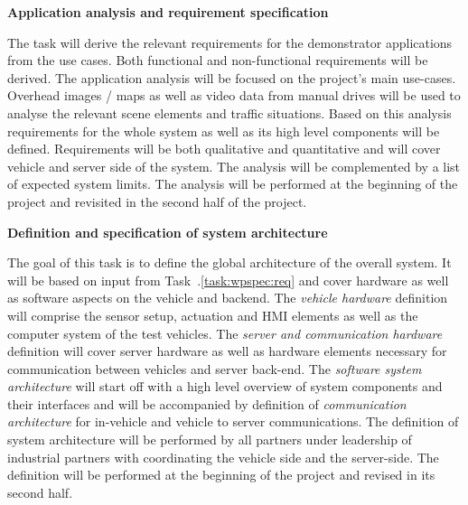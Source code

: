 {\begin{tasks}{\WPSpecificationNo}
\item  {\bf Application analysis and requirement specification}
  \label{task:wpspec:req}

The task will derive the relevant requirements for the demonstrator applications from the use cases. Both functional and non-functional requirements will be derived. The application analysis will be focused on the project's main use-cases. Overhead images / maps as well as video data from manual drives will be used to analyse the relevant scene elements and traffic situations. Based on this analysis requirements for the whole system as well as its high level components will be defined. Requirements will be both qualitative and quantitative and will cover vehicle and server side of the system. The analysis will be complemented by a list of expected system limits. The analysis will be performed at the beginning of the project and revisited in the second half of the project.


%


\item {\bf Definition and specification of system architecture}
  \label{task:wpint:arch}

The goal of this task is to define the global architecture of the overall system. It will be based on input from Task~\WPSpecificationNo.\ref{task:wpspec:req} and cover hardware as well as software aspects on the vehicle and backend. The \emph{vehicle hardware} definition will comprise the sensor setup, actuation and HMI elements as well as the computer system of the test vehicles. The \emph{server and communication hardware} definition will cover server hardware as well as hardware elements necessary for communication between vehicles and server back-end. The \emph{software system architecture} will start off with a high level overview of system components and their interfaces and will be accompanied by definition of \emph{communication architecture} for in-vehicle and vehicle to server communications. The definition of system architecture will be performed by all partners under leadership of industrial partners with \VW{} coordinating the vehicle side and \IBM{} the server-side. The definition will be performed at the beginning of the project and revised in its second half.



\end{tasks}}
